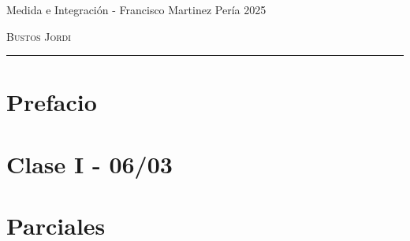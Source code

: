 \documentclass[12pt,a4paper]{book}
\begin{document}
\renewcommand{\contentsname}{\vspace{0cm} Contenido \vspace{-2cm}}

\begin{titlepage}
    \vspace*{2cm}

    \noindent
    \vspace*{0.5cm}

    \vspace{1.5cm}
    \epigraph{Medida e Integración - Francisco Martinez Pería 2025}%
    {\textsc{Bustos Jordi}}
    \null\vfill
    \vspace*{1cm}
    \noindent
    \hfill
    \begin{minipage}{0.7\linewidth}
        \begin{flushright}
            \printauthor
        \end{flushright}
    \end{minipage}
    \begin{minipage}{0.02\linewidth}
        \rule{1pt}{70pt}
    \end{minipage}
    \titlepagedecoration
\end{titlepage}

\let\cleardoublepage=\clearpage
\tableofcontents
\blankpage

\chapter*{Prefacio}

\newpage\thispagestyle{empty}\blankpage

\chapter{Clase I - 06/03 }

\newpage\thispagestyle{empty}\blankpage

\chapter{Parciales}


\blankpage



\nocite{*}
\end{document}
